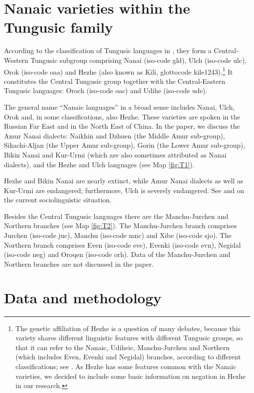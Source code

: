 \documentclass[output=paper]{langscibook}
\begin{document}
\section{Nanaic varieties within the Tungusic family}\label{sec:T2}

According to the classification of Tungusic languages in \citet{doerfer1978a}, they form a Central-Western Tungusic subgroup comprising Nanai (iso-code gld), Ulch (iso-code ulc), Orok (iso-code oaa) and Hezhe (also known as Kili, glottocode kile1243).\footnote{The genetic affiliation of Hezhe is a question of many debates, because this variety shares different linguistic features with different Tungusic groups, so that it can refer to the Nanaic, Udiheic, Manchu-Jurchen and Northern (which includes Even, Evenki and Negidal) branches, according to different classifications; see \citet{hoelzl2017a}. As Hezhe has some features common with the Nanaic varieties, we decided to include some basic information on negation in Hezhe in our research.} It constitutes the Central Tungusic group together with the Central-Eastern Tungusic languages: Oroch (iso-code oac) and Udihe (iso-code ude).

The general name “Nanaic languages” in a broad sense includes Nanai, Ulch, Orok and, in some classifications, also Hezhe. These varieties are spoken in the Russian Far East and in the North East of China. In the paper, we discuss the Amur Nanai dialects: Naikhin and Dzhuen (the Middle Amur sub-group), Sikachi-Aljan (the Upper Amur sub-group), Gorin (the Lower Amur sub-group), Bikin Nanai and Kur-Urmi (which are also sometimes attributed as Nanai dialects), and the Hezhe and Ulch languages (see Map \ref{fig:T1}).

Hezhe and Bikin Nanai are nearly extinct, while Amur Nanai dialects as well as Kur-Urmi are endangered; furthermore, Ulch is severely endangered. See \citet{gerasimova2002a, sumbatova2016a} and \citet{kalinina2016a} on the current sociolinguistic situation.

Besides the Central Tungusic languages there are the Manchu-Jurchen and Northern branches (see Map \ref{fig:T2}). The Manchu-Jurchen branch comprises Jurchen (iso-code juc), Manchu (iso-code mnc) and Xibe (iso-code sjo). The Northern branch comprises Even (iso-code eve), Evenki (iso-code evn), Negidal (iso-code neg) and Oroqen (iso-code orh). Data of the Manchu-Jurchen and Northern branches are not discussed in the paper.

\section{Data and methodology}\label{sec:T3}
\end{document}
